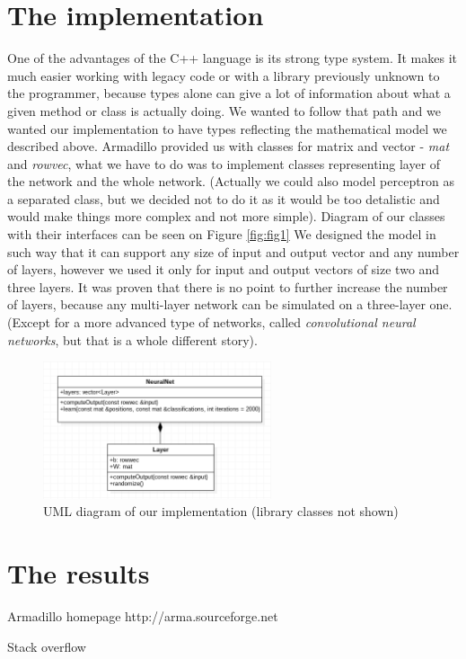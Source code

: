 \documentclass[3p,twocolumn]{elsarticle}
\begin{document}
\section{The implementation}

One of the advantages of the C++ language is its strong type system. It makes it much easier working with legacy code or with a library previously unknown to the programmer, because types alone can give a lot of information about what a given method or class is actually doing. We wanted to follow that path and we wanted our implementation to have types reflecting the mathematical model we described above. Armadillo provided us with classes for matrix and vector - \emph{mat} and \emph{rowvec}, what we have to do was to implement classes representing layer of the network and the whole network. (Actually we could also model perceptron as a separated class, but we decided not to do it as it would be too detalistic and would make things more complex and not more simple). Diagram of our classes with their interfaces can be seen on Figure \ref{fig:fig1} We designed the model in such way that it can support any size of input and output vector and any number of layers, however we used it only for input and output vectors of size two and three layers. It was proven that there is no point to further increase the number of layers, because any multi-layer network can be simulated on a three-layer one. (Except for a more advanced type of networks, called \emph{convolutional neural networks}, but that is a whole different story).

\begin{figure}[fig2]
	
\label{fig:fig3}
  \includegraphics[width=0.60\textwidth]{uml-diagram.png}
	\caption{UML diagram of our implementation (library classes not shown)}
	\label{fig3}
\end{figure}

\section{The results}


%

 \begin{thebibliography}{00}

%

  Armadillo homepage http://arma.sourceforge.net
 
  Stack overflow

 \end{thebibliography}
\end{document}
